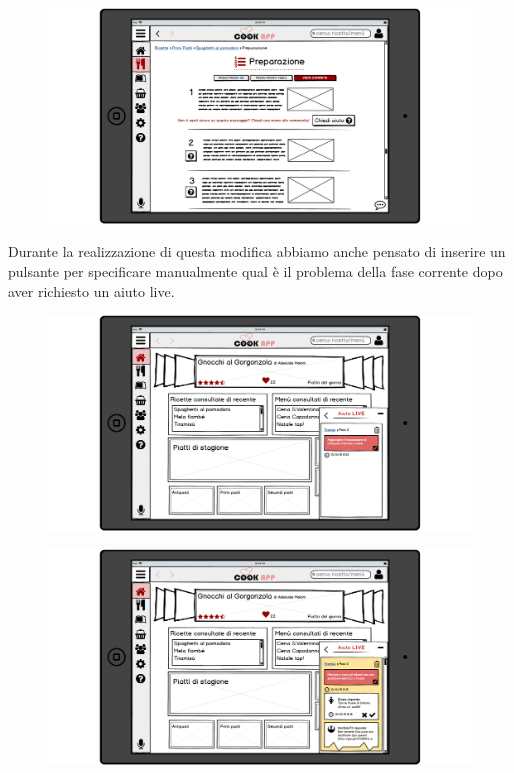 \begin{figure}[H]
	\includegraphics[width=\linewidth]{img/mockup/Ricetta5-fixed.png}
\end{figure}

Durante la realizzazione di questa modifica abbiamo anche
pensato di inserire un pulsante per specificare manualmente qual è il
problema della fase corrente dopo aver richiesto un aiuto live.

\begin{figure}[H]
	\includegraphics[width=\linewidth]{img/mockup/Live2-fixed.png}
\end{figure}

\begin{figure}[H]
	\includegraphics[width=\linewidth]{img/mockup/Live3-fixed.png}
\end{figure}


